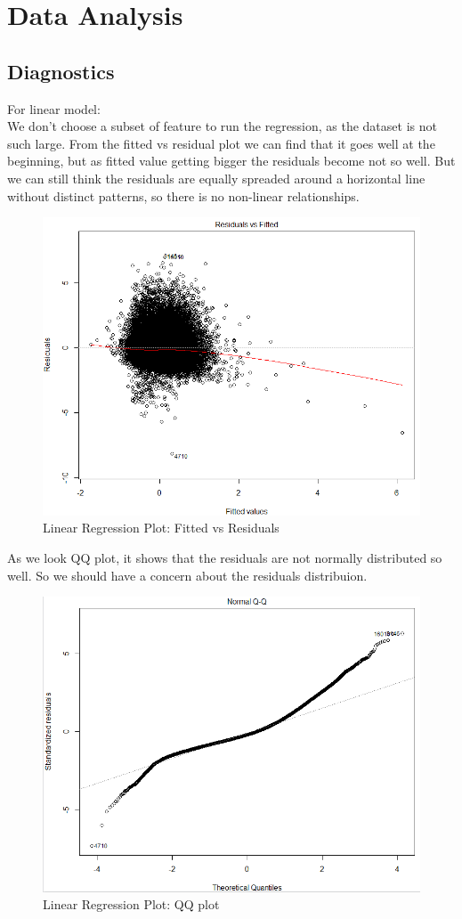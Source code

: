 \documentclass[11pt]{article}
\begin{document}
\section{Data Analysis}
\subsection{Diagnostics}
For linear model: \\
    We don't choose a subset of feature to run the regression, as the dataset is not such large. From the fitted vs residual plot we can find that it goes well at the beginning, but as fitted value getting bigger the residuals become not so well. But we can still think the residuals are equally spreaded around a horizontal line without distinct patterns, so there is no non-linear relationships.   \\
    
    \begin{figure}[h]
        \centering
        \includegraphics[width=0.7\linewidth]{linear_fvsr.png}
        \caption{Linear Regression Plot: Fitted vs Residuals}
    \end{figure}  
    
    As we look QQ plot, it shows that the residuals are not normally distributed so well. So we should have a concern about the residuals distribuion.\\
    
    \begin{figure}[h]
        \centering
        \includegraphics[width=0.7\linewidth]{linear_qq.png}
        \caption{Linear Regression Plot: QQ plot}
    \end{figure}    
    
\end{document}
